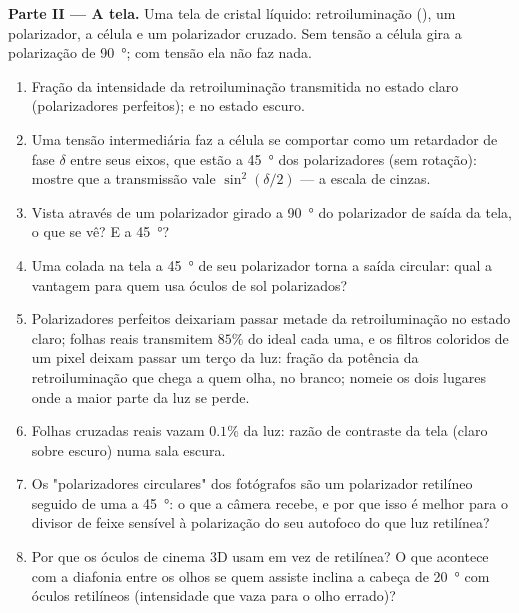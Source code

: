 \begin{problem}
\medskip
\noindent\textbf{Parte II --- A tela.}
Uma tela de cristal líquido: retroiluminação (), um polarizador, a
célula e um polarizador cruzado. Sem tensão a célula gira a
polarização de \qty{90}{\degree}; com tensão ela não faz nada.
\begin{enumerate}[resume]
  \item Fração da intensidade da retroiluminação transmitida no
        estado claro (polarizadores perfeitos); e no estado escuro.
  \item Uma tensão intermediária faz a célula se comportar como um retardador
        de fase $\delta$ entre seus eixos, que estão a \qty{45}{\degree} dos
        polarizadores (sem rotação): mostre que a transmissão vale
        $\sin^2(\delta/2)$ --- a escala de cinzas.
  \item Vista através de um polarizador girado a \qty{90}{\degree} do
        polarizador de saída da tela, o que se vê? E a \qty{45}{\degree}?
  \item Uma  colada na tela a \qty{45}{\degree} de seu
        polarizador torna a saída circular: qual a vantagem para quem
        usa óculos de sol polarizados?
  \item Polarizadores perfeitos deixariam passar metade da retroiluminação no
        estado claro; folhas reais transmitem $85\%$ do ideal cada uma, e
        os filtros coloridos de um pixel deixam passar um terço da luz:
        fração da potência da retroiluminação que chega a quem olha, no branco;
        nomeie os dois lugares onde a maior parte da luz se perde.
  \item Folhas cruzadas reais vazam $0.1\%$ da luz: razão de contraste
        da tela (claro sobre escuro) numa sala escura.
  \item Os "polarizadores circulares" dos fotógrafos são um polarizador retilíneo
        seguido de uma  a \qty{45}{\degree}: o que a
        câmera recebe, e por que isso é melhor para o divisor de feixe
        sensível à polarização do seu autofoco do que
        luz retilínea?
  \item Por que os óculos de cinema 3D usam  em vez de
        retilínea? O que acontece com a diafonia entre os olhos
        se quem assiste inclina a cabeça de \qty{20}{\degree} com óculos
        retilíneos (intensidade que vaza para o olho errado)?
\end{enumerate}


\end{problem}
